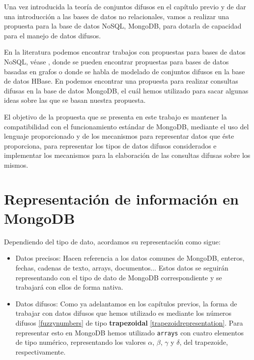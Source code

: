 \label{propuesta}
Una vez introducida la teoría de conjuntos difusos en el capítulo previo y de dar una introducción a las bases de datos no relacionales, vamos a realizar una propuesta para la base de datos NoSQL, MongoDB, para dotarla de capacidad para el manejo de datos difusos.

En la literatura podemos encontrar trabajos con propuestas para bases de datos NoSQL, véase \cite{fuzzyquerygraph, fuzzyquerygraph2, fuzzyquerygraph3}, donde se pueden encontrar propuestas para bases de datos basadas en grafos o \cite{fuzzyqueryhbase} donde se habla de modelado de conjuntos difusos en la base de datos HBase. En \cite{fuzzyquerymongo} podemos encontrar una propuesta para realizar consultas difusas en la base de datos MongoDB, el cuál hemos utilizado para sacar algunas ideas sobre las que se basan nuestra propuesta.

El objetivo de la propuesta que se presenta en este trabajo es mantener la compatibilidad con el funcionamiento estándar de MongoDB, mediante el uso del lenguaje proporcionado y de los mecanismos para representar datos que éste proporciona, para representar los tipos de datos difusos considerados e implementar los mecanismos para la elaboración de las consultas difusas sobre los mismos.

\section{Representación de información en MongoDB}

Dependiendo del tipo de dato, acordamos su representación como sigue:

\begin{itemize}
    \item Datos precisos: Hacen referencia a los datos comunes de MongoDB, enteros, fechas, cadenas de texto, arrays, documentos... Estos datos se seguirán representando con el tipo de dato de MongoDB correspondiente y se trabajará con ellos de forma nativa.
    \item Datos difusos: Como ya adelantamos en los capítulos previos, la forma de trabajar con datos difusos que hemos utilizado es mediante los números difusos \ref{fuzzynumbers} de tipo \textbf{trapezoidal} \ref{trapezoidrepresentation}. Para representar esto en MongoDB hemos utilizado \texttt{arrays} con cuatro elementos de tipo numérico, representando los valores $\alpha$, $\beta$, $\gamma$ y $\delta$, del trapezoide, respectivamente.
\end{itemize}

